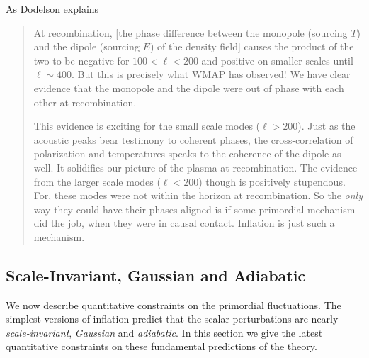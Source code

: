 \documentclass[12pt,letterpaper,rotate]{article}
\def\R{{\cal R}}
\begin{document}
{As Dodelson explains \cite{Dodelson:2003ip}
\begin{quote}
At recombination, [the phase difference between the monopole (sourcing $T$) and the dipole (sourcing $E$) of the density field] causes the product of the two to be negative for $100< \ell < 200$ and positive on smaller scales until $\ell \sim 400$. But this is precisely what WMAP has observed! We have clear evidence that the monopole and the dipole were out of phase with each other at recombination.

This evidence is exciting for the small scale modes ($\ell > 200$). Just as the acoustic peaks bear testimony to coherent phases, the cross-correlation of polarization and temperatures speaks to the coherence of the dipole as well. It solidifies our picture of the plasma at recombination. 
The evidence from the larger scale modes ($\ell < 200$) though is positively stupendous. For, these modes were not within the horizon at recombination. So the {\it only} way they could have their phases aligned is if some primordial mechanism did the job, when they were in causal contact. Inflation is just such a mechanism.
\end{quote}


\subsection{Scale-Invariant, Gaussian and Adiabatic}
\label{sec:obs}

We now describe quantitative constraints on the primordial fluctuations.
The simplest versions of inflation predict that the scalar perturbations are nearly {\it scale-invariant}, {\it Gaussian} and {\it adiabatic}. In this section we give the latest quantitative constraints on these fundamental predictions of the theory.


}
\end{document}
